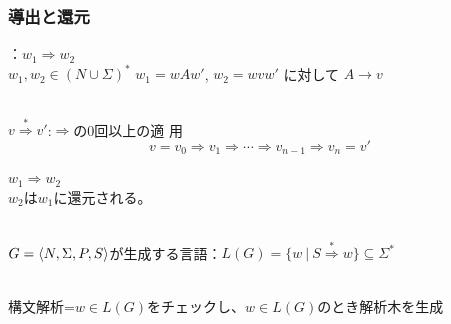 \documentclass[dvipdfmx]{beamer}
\begin{document}
\begin{frame}
  \frametitle{導出と還元}
  \begin{list}{}{\setlength{\itemsep}{5pt}}
    \item [\bluetext{{\bf 導出}}]：$w_1\Rightarrow w_2$\\
          $w_1,w_2\in (N\cup\Sigma)^\ast$
          $w_1=wAw'$, $w_2=wvw'$ に対して $A\rightarrow v$
    \item [\bluetext{{\bf 導出関係}}]\ \\
          $v\stackrel{\ast}{\Rightarrow} v'$:$\Rightarrow$の0回以上の適
          用
          \[
            v=v_0\Rightarrow v_1\Rightarrow\cdots\Rightarrow
            v_{n-1}\Rightarrow v_n=v'
          \]
    \item [\bluetext{\bf 還元}] $w_1\Rightarrow w_2$\\
          $w_2$は$w_1$に還元される。
    \item [\bluetext{\bf 生成言語}]\ \\
          $G=\langle{N,\Sigma,P,S}\rangle$が生成する言語：$L(G)=\{w\ |\
            S\stackrel{\ast}{\Rightarrow}w\}\subseteq \Sigma^\ast$
  \end{list}
  \\
  構文解析=$w\in L(G)$をチェックし、$w\in L(G)$のとき解析木を生成
\end{frame}
\end{document}
